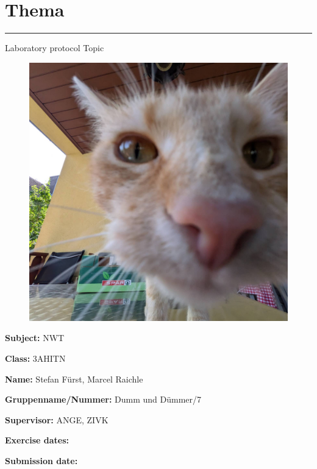 \documentclass[a4paper]{article}
\newcommand{\abc}{\hfill \break}
\begin{document}

\pagestyle{oida}
\section*{Thema}
\par\noindent\rule{\textwidth}{0.4pt}

Laboratory protocol
Topic

\begin{figure}[h]
	\includegraphics[scale=0.2]{images/mika.jpeg}
	\centering
\end{figure}

\vspace*{\fill}
\textbf{Subject:}	NWT\abc

\textbf{Class:}	3AHITN\abc

\textbf{Name:}	Stefan Fürst, Marcel Raichle\abc

\textbf{Gruppenname/Nummer:} Dumm und Dümmer/7\abc

\textbf{Supervisor:} 	ANGE, ZIVK\abc

\textbf{Exercise dates:}	\abc

\textbf{Submission date:}\abc

\abc \abc \abc \abc

\newpage
\tableofcontents

\newpage
\end{document}
